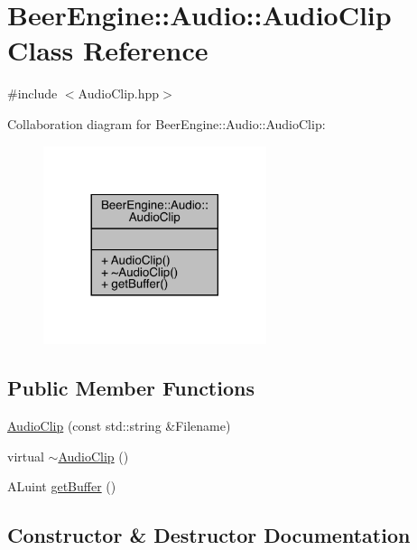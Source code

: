 \hypertarget{class_beer_engine_1_1_audio_1_1_audio_clip}{}\section{Beer\+Engine\+:\+:Audio\+:\+:Audio\+Clip Class Reference}
\label{class_beer_engine_1_1_audio_1_1_audio_clip}


{\ttfamily \#include $<$Audio\+Clip.\+hpp$>$}



Collaboration diagram for Beer\+Engine\+:\+:Audio\+:\+:Audio\+Clip\+:\nopagebreak
\begin{figure}[H]
\begin{center}
\leavevmode
\includegraphics[width=185pt]{class_beer_engine_1_1_audio_1_1_audio_clip__coll__graph}
\end{center}
\end{figure}
\subsection*{Public Member Functions}
\begin{DoxyCompactItemize}
\item 
\mbox{\hyperlink{class_beer_engine_1_1_audio_1_1_audio_clip_a772f38ce051240a286fcb90d8d107e08}{Audio\+Clip}} (const std\+::string \&Filename)
\item 
virtual \mbox{\hyperlink{class_beer_engine_1_1_audio_1_1_audio_clip_a3ccd8ba4bcb6652acaaa05a8313be1b2}{$\sim$\+Audio\+Clip}} ()
\item 
A\+Luint \mbox{\hyperlink{class_beer_engine_1_1_audio_1_1_audio_clip_a02ffa4d4a75311f1a4d59b49e236a07e}{get\+Buffer}} ()
\end{DoxyCompactItemize}


\subsection{Constructor \& Destructor Documentation}
\mbox{\label{class_beer_engine_1_1_audio_1_1_audio_clip_a772f38ce051240a286fcb90d8d107e08}} 
